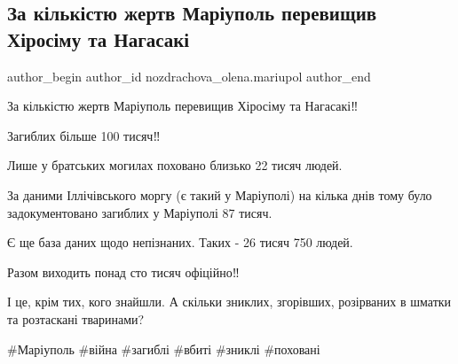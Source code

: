  
 
 
 
 

\subsection{За кількістю жертв Маріуполь перевищив Хіросіму та Нагасакі}
\label{sec:29_08_2022.fb.nozdrachova_olena.mariupol.1.za_k_lk_styu_zhertv_}

\ifcmt
 author_begin
   author_id nozdrachova_olena.mariupol
 author_end
\fi

За кількістю жертв Маріуполь перевищив Хіросіму та Нагасакі‼️ 

Загиблих більше 100 тисяч‼️

Лише у братських могилах поховано близько 22 тисяч людей.

За даними Іллічівського моргу (є такий у Маріуполі) на кілька днів тому було
задокументовано загиблих у Маріуполі 87 тисяч.  

Є ще база даних щодо непізнаних.  Таких - 26 тисяч 750 людей.  

Разом виходить понад сто тисяч офіційно‼️

І це, крім тих, кого знайшли. А скільки зниклих, згорівших, розірваних в шматки
та розтаскані тваринами?

\#Маріуполь \#війна \#загиблі \#вбиті \#зниклі \#поховані

